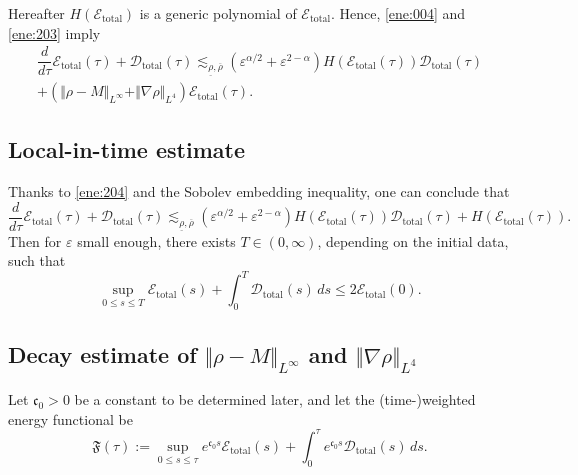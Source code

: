 \documentclass[11pt]{article}
\theoremstyle{plain}
\theoremstyle{definition}
\theoremstyle{remark}
\newcommand{\mrm}[1]{\mathrm{#1}}
\newcommand{\norm}[2]{\Vert #1 \Vert_{#2}}
\numberwithin{equation}{section}
\begin{document}
Hereafter $ H(\mathcal E_\mrm{total}) $ is a generic polynomial of $ \mathcal E_\mrm{total} $. 
Hence, \eqref{ene:004} and \eqref{ene:203} imply
\begin{equation}
    \label{ene:204}
    \begin{gathered}
        \dfrac{d}{d\tau}  \mathcal E_\mrm{total}(\tau) +  \mathcal D_\mrm{total}(\tau) \lesssim_{\underline \rho, \overline\rho} 
        (\varepsilon^{\alpha/2} + \varepsilon^{2-\alpha}) H(\mathcal E_\mrm{total}(\tau)) \mathcal D_\mrm{total}(\tau) \\
        + (\norm{\rho-M}{L^\infty} + \norm{\nabla \rho}{L^4}) \mathcal E_\mrm{total}(\tau).
    \end{gathered}
\end{equation}


\subsection{Local-in-time estimate}
\label{sec:local-estimate}
Thanks to \eqref{ene:204} and the Sobolev embedding inequality, one can conclude that 
\begin{equation}
    \label{ene:301}
    \dfrac{d}{d\tau}  \mathcal E_\mrm{total}(\tau) +  \mathcal D_\mrm{total}(\tau) \lesssim_{\underline \rho, \overline\rho} 
        (\varepsilon^{\alpha/2} + \varepsilon^{2-\alpha}) H(\mathcal E_\mrm{total}(\tau)) \mathcal D_\mrm{total}(\tau) + H(\mathcal E_\mrm{total}(\tau)). 
\end{equation}
Then for $ \varepsilon $ small enough, there exists $ T \in (0,\infty) $, depending on the initial data, such that
\begin{equation}
    \label{ene:302}
    \sup_{0\leq s  \leq T} \mathcal E_\mrm{total}(s) + \int_0^T \mathcal D_\mrm{total}(s) \,ds \leq 2 \mathcal E_\mrm{total}(0). 
\end{equation}

\subsection{Decay estimate of $ \norm{\rho-M}{L^\infty} $ and $ \norm{\nabla \rho}{L^4} $}
\label{sec:decay-l-infty-4}

Let $ \mathfrak{c}_0 > 0 $ be a constant to be determined later, and let the (time-)weighted energy functional be 
\begin{equation}
    \label{ene:400}
    \mathfrak F(\tau) := \sup_{0\leq s \leq \tau }e^{\mathfrak c_0 s} \mathcal E_\mrm{total}(s) + \int_0^\tau e^{\mathfrak c_0 s} \mathcal D_{\mrm{total}}(s)\,ds.
\end{equation}
\end{document}
